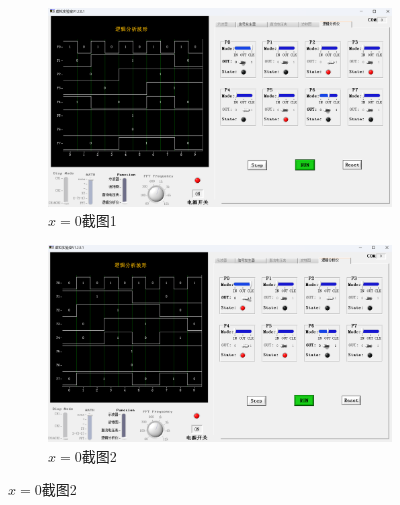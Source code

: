 \documentclass{ctexart}
\begin{document}
\begin{figure}[H]
    \centering
    \begin{minipage}{0.4\textwidth}
        \begin{figure}[H]
            \centering
            \includegraphics[width=\textwidth]{x=0_1.png}
            \caption{$x=0$截图1}
        \end{figure}
    \end{minipage}
    \hspace{0.1\textwidth}
    \begin{minipage}{0.4\textwidth}
        \begin{figure}[H]
            \centering
            \includegraphics[width=\textwidth]{x=0_2.png}
            \caption{$x=0$截图2}
        \end{figure}
    \end{minipage}
\end{figure}
\end{document}

